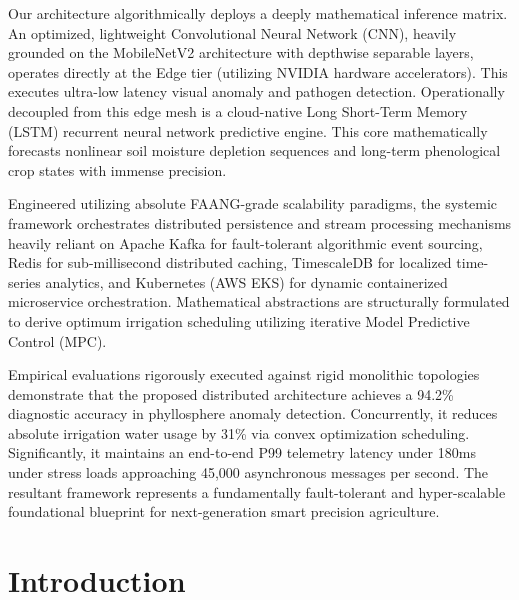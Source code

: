 \documentclass[12pt, a4paper]{report}
\begin{document}
Our architecture algorithmically deploys a deeply mathematical inference matrix. An optimized, lightweight Convolutional Neural Network (CNN), heavily grounded on the MobileNetV2 architecture with depthwise separable layers, operates directly at the Edge tier (utilizing NVIDIA hardware accelerators). This executes ultra-low latency visual anomaly and pathogen detection. Operationally decoupled from this edge mesh is a cloud-native Long Short-Term Memory (LSTM) recurrent neural network predictive engine. This core mathematically forecasts nonlinear soil moisture depletion sequences and long-term phenological crop states with immense precision.

Engineered utilizing absolute FAANG-grade scalability paradigms, the systemic framework orchestrates distributed persistence and stream processing mechanisms heavily reliant on Apache Kafka for fault-tolerant algorithmic event sourcing, Redis for sub-millisecond distributed caching, TimescaleDB for localized time-series analytics, and Kubernetes (AWS EKS) for dynamic containerized microservice orchestration. Mathematical abstractions are structurally formulated to derive optimum irrigation scheduling utilizing iterative Model Predictive Control (MPC).

Empirical evaluations rigorously executed against rigid monolithic topologies demonstrate that the proposed distributed architecture achieves a 94.2\% diagnostic accuracy in phyllosphere anomaly detection. Concurrently, it reduces absolute irrigation water usage by 31\% via convex optimization scheduling. Significantly, it maintains an end-to-end P99 telemetry latency under 180ms under stress loads approaching 45,000 asynchronous messages per second. The resultant framework represents a fundamentally fault-tolerant and hyper-scalable foundational blueprint for next-generation smart precision agriculture.

\newpage
{}
\tableofcontents
\newpage
\listoffigures
\newpage
\listoftables
\newpage
{}

\chapter{Introduction}
\end{document}
